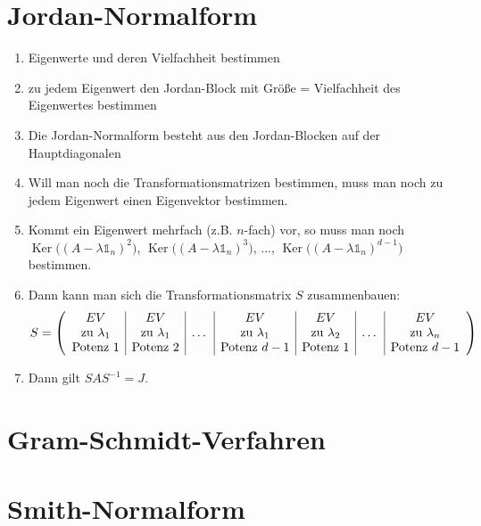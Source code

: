 \documentclass[ngerman,a4paper]{article}
\DeclareMathOperator{\Ker}{Ker}
\begin{document}
\section{Jordan-Normalform}
\begin{enumerate}[label=\textbf{\arabic*.}]
	\item Eigenwerte und deren Vielfachheit bestimmen
	\item zu jedem Eigenwert den Jordan-Block mit Größe = Vielfachheit des Eigenwertes bestimmen
	\item Die Jordan-Normalform besteht aus den Jordan-Blocken auf der Hauptdiagonalen
	\item Will man noch die Transformationsmatrizen bestimmen, muss man noch zu jedem Eigenwert einen Eigenvektor bestimmen.
	\item Kommt ein Eigenwert mehrfach (z.B. $n$-fach) vor, so muss man noch $\Ker\big((A-\lambda\mathbb{1}_n)^2\big)$, $\Ker\big((A-\lambda\mathbb{1}_n)^3\big)$, ..., $\Ker\big((A-\lambda\mathbb{1}_n)^{d-1}\big)$ bestimmen.
	\item Dann kann man sich die Transformationsmatrix $S$ zusammenbauen:
	\begin{align}
		S = \left(\begin{array}{c|c|c|c|c|c|c}
		EV & EV &  & EV & EV &  & EV \\
		\text{zu }\lambda_1 & \text{zu }\lambda_1 & \dots & \text{zu }\lambda_1 & \text{zu }\lambda_2 & \dots & \text{zu }\lambda_n \\
		\text{Potenz }1 & \text{Potenz }2 & & \text{Potenz }d-1 & \text{Potenz }1 & & \text{Potenz }d-1
		\end{array}\right)\notag
	\end{align}
	\item Dann gilt $SAS^{-1}=J$.
\end{enumerate}

\section{Gram-Schmidt-Verfahren}

\section{Smith-Normalform}
\end{document}
